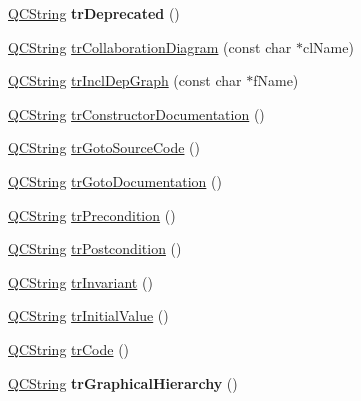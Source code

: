 \begin{DoxyCompactItemize}
\mbox{\label{class_translator_dutch_adf1bd453eaf6c0b6352903b2a1a0fb09}} 
\mbox{\hyperlink{class_q_c_string}{Q\+C\+String}} {\bfseries tr\+Deprecated} ()
\item 
\mbox{\hyperlink{class_q_c_string}{Q\+C\+String}} \mbox{\hyperlink{class_translator_dutch_a2ef465171e65b75761ad316e865f9af6}{tr\+Collaboration\+Diagram}} (const char $\ast$cl\+Name)
\item 
\mbox{\hyperlink{class_q_c_string}{Q\+C\+String}} \mbox{\hyperlink{class_translator_dutch_a3aafa4ebdd42932394a07d38a1e7919e}{tr\+Incl\+Dep\+Graph}} (const char $\ast$f\+Name)
\item 
\mbox{\hyperlink{class_q_c_string}{Q\+C\+String}} \mbox{\hyperlink{class_translator_dutch_a6710e7fd2ed997fc65f0cabe64102f2a}{tr\+Constructor\+Documentation}} ()
\item 
\mbox{\hyperlink{class_q_c_string}{Q\+C\+String}} \mbox{\hyperlink{class_translator_dutch_a41d8d60d67fa80798f103a943e562a60}{tr\+Goto\+Source\+Code}} ()
\item 
\mbox{\hyperlink{class_q_c_string}{Q\+C\+String}} \mbox{\hyperlink{class_translator_dutch_abd91657edc96c609f36ff6d960312680}{tr\+Goto\+Documentation}} ()
\item 
\mbox{\hyperlink{class_q_c_string}{Q\+C\+String}} \mbox{\hyperlink{class_translator_dutch_a43002ae5834ed3ec426193706c6f81f2}{tr\+Precondition}} ()
\item 
\mbox{\hyperlink{class_q_c_string}{Q\+C\+String}} \mbox{\hyperlink{class_translator_dutch_aa8833fa29e2177386a097a715f8e1eea}{tr\+Postcondition}} ()
\item 
\mbox{\hyperlink{class_q_c_string}{Q\+C\+String}} \mbox{\hyperlink{class_translator_dutch_aaef534a27430bfbcddd70c08967be07a}{tr\+Invariant}} ()
\item 
\mbox{\hyperlink{class_q_c_string}{Q\+C\+String}} \mbox{\hyperlink{class_translator_dutch_a91a93095e1b1e7beaee449d44095094a}{tr\+Initial\+Value}} ()
\item 
\mbox{\hyperlink{class_q_c_string}{Q\+C\+String}} \mbox{\hyperlink{class_translator_dutch_a94a325d5f9211ccf02bcfebb328b06fa}{tr\+Code}} ()
\item 
\mbox{\label{class_translator_dutch_a3e6ab8cf5b844d4a9d544970d0dae6b2}} 
\mbox{\hyperlink{class_q_c_string}{Q\+C\+String}} {\bfseries tr\+Graphical\+Hierarchy} ()
\item 
\mbox{\label{class_translator_dutch_a6ee53b5c37b48e641e00e129ec953ee7}} 

\end{DoxyCompactItemize}
